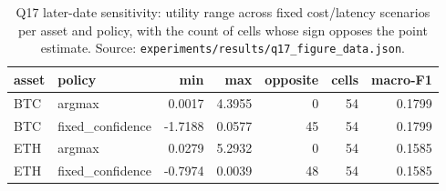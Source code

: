 \begin{table}[h]\centering
\caption{Q17 later-date sensitivity: utility range across fixed cost/latency scenarios per
asset and policy, with the count of cells whose sign opposes the point estimate. Source:
\texttt{experiments/results/q17\_figure\_data.json}.}
\label{tab:q17ranges}
\begin{tabular}{llrrrrr}
\toprule
asset & policy & min & max & opposite & cells & macro-F1 \\
\midrule
BTC & argmax & 0.0017 & 4.3955 & 0 & 54 & 0.1799 \\
BTC & fixed\_confidence & -1.7188 & 0.0577 & 45 & 54 & 0.1799 \\
ETH & argmax & 0.0279 & 5.2932 & 0 & 54 & 0.1585 \\
ETH & fixed\_confidence & -0.7974 & 0.0039 & 48 & 54 & 0.1585 \\
\bottomrule
\end{tabular}
\end{table}

